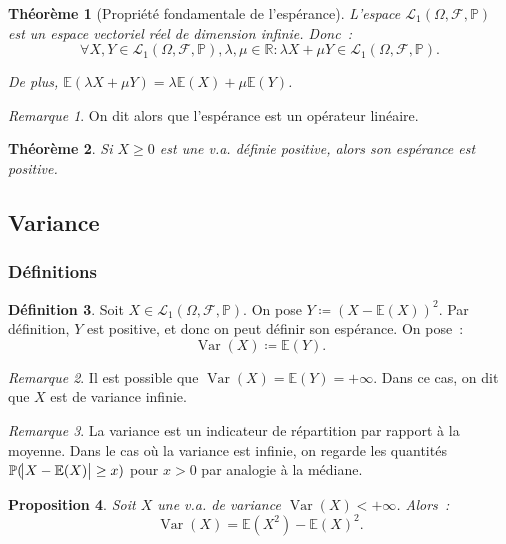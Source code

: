 \documentclass{article}
\newcommand{\E}{\mathbb E}
\renewcommand{\P}{\mathbb P}
\newcommand{\R}{\mathbb R}
\newcommand{\espproba}[3]{\left(#1, #2, #3\right)}  %
\newcommand{\Ofp}{\espproba \Omega{\mathcal F}\P}  %
\newcommand{\Lu}{\mathcal L_1\Ofp}  %
\DeclareMathOperator{\Var}{Var}
\newtheorem{thm}{Théorème}[section]
\newtheorem{prp}[thm]{Proposition}
\theoremstyle{definition}
\newtheorem{déf}[thm]{Définition}
\theoremstyle{remark}
\newtheorem*{rmq}{Remarque}
\begin{document}
		\begin{thm}[Propriété fondamentale de l'espérance] L'espace $\Lu$ est un espace vectoriel réel de dimension infinie. Donc~:
		\[\forall X, Y \in \Lu, \lambda, \mu \in \R : \lambda X + \mu Y \in \Lu.\]

		De plus, $\E(\lambda X + \mu Y) = \lambda \E(X) + \mu \E(Y)$.
		\end{thm}

		\begin{rmq} On dit alors que l'espérance est un opérateur linéaire. \end{rmq}

		\begin{thm} Si $X \geq 0$ est une v.a. définie positive, alors son espérance est positive. \end{thm}

	\subsection{Variance}
		\subsubsection{Définitions}
		\begin{déf} Soit $X \in \Lu$. On pose $Y \coloneqq (X - \E(X))^2$. Par définition, $Y$ est positive, et donc on peut définir son espérance. On pose~:
		\begin{equation}
			\Var(X) \coloneqq \E(Y).
		\end{equation}
		\end{déf}

		\begin{rmq} Il est possible que $\Var(X) = \E(Y) = +\infty$. Dans ce cas, on dit que $X$ est de variance infinie. \end{rmq}

		\begin{rmq} La variance est un indicateur de répartition par rapport à la moyenne. Dans le cas où la variance est infinie, on regarde les quantités
		$\P(\abs{X - \E(X)} \geq x)$ pour $x > 0$ par analogie à la médiane. \end{rmq}

		\begin{prp}\label{var=e-e} Soit $X$ une v.a. de variance $\Var(X) < +\infty$. Alors~:
		\begin{equation}\label{eq:var=e-e}
			\Var(X) = \E(X^2) - \E(X)^2.
		\end{equation}
		\end{prp}
\end{document}
